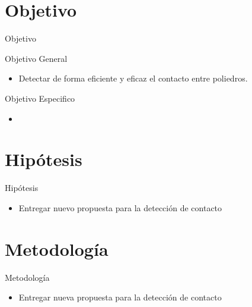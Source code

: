 \documentclass[11pt]{beamer}
\begin{document}
\section{Objetivo}
\begin{frame}{Objetivo}
\begin{block}{Objetivo General}
 \begin{itemize}
    \item Detectar de forma eficiente y eficaz el contacto entre poliedros.
 \end{itemize}
\end{block}
\begin{block}{Objetivo Especifico}
 \begin{itemize}
  \item 
 \end{itemize}
\end{block}
\end{frame}     

\section{Hipótesis}
\begin{frame}{Hipótesis}
\begin{itemize}
    \item Entregar nuevo propuesta para la detección de contacto
\end{itemize}
\end{frame}

\section{Metodología}
\begin{frame}{Metodología}
\begin{itemize}
    \item Entregar nueva propuesta para la detección de contacto
\end{itemize}
\end{frame}

\medskip


\end{document}

